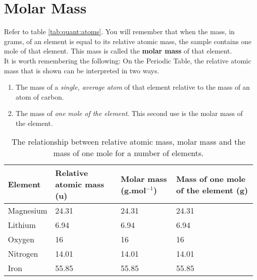 



\section{Molar Mass}
\label{subsec:quant:mm}


Refer to table \ref{tab:quant:atoms}. You will remember that when the mass, in grams, of an element is equal to its relative atomic mass, the sample contains one mole of that element. This mass is called the \textbf{molar mass} of that element.\\

It is worth remembering the following: On the Periodic Table, the relative atomic mass that is shown can be interpreted in two ways.

\begin{enumerate}
\item{The mass of a \textit{single, average atom} of that element relative to the mass of an atom of carbon.}
\item{The mass of \textit{one mole of the element}. This second use is the molar mass of the element.}
\end{enumerate}

\begin{table}[h]
\caption{The relationship between relative atomic mass, molar mass and the mass of one mole for a number of elements.}
\label{tab:mole summary}
\begin{center}
\begin{tabular}{|p{2cm}|p{2cm}|p{2cm}|p{2cm}|}\hline
\textbf{Element} & \textbf{Relative atomic mass (u)} & \textbf{Molar mass (g.mol$^{-1}$)} & \textbf{Mass of one mole of the element (g)} \\\hline
Magnesium & 24.31 & 24.31 & 24.31 \\\hline
Lithium & 6.94 & 6.94 & 6.94 \\\hline
Oxygen & 16 & 16 & 16 \\\hline
Nitrogen & 14.01 & 14.01 & 14.01 \\\hline
Iron & 55.85 & 55.85 & 55.85 \\\hline
\end{tabular}
\end{center}
\end{table}

